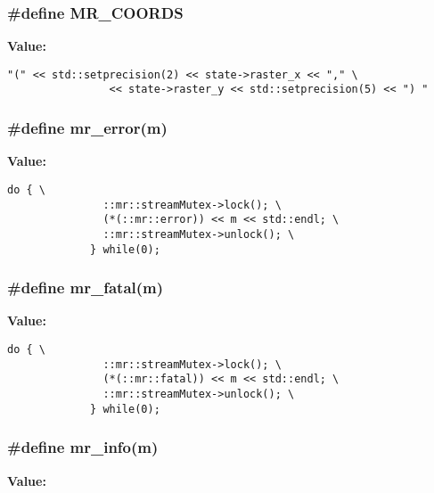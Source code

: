 \subsubsection{\setlength{\rightskip}{0pt plus 5cm}\#define MR\_\-COORDS}\label{mrStream_8h_a7}


{\bf Value:}

\footnotesize\begin{verbatim}"(" << std::setprecision(2) << state->raster_x << "," \
                << state->raster_y << std::setprecision(5) << ") "
\end{verbatim}\normalsize 
{}
\subsubsection{\setlength{\rightskip}{0pt plus 5cm}\#define mr\_\-error(m)}\label{mrStream_8h_a4}


{\bf Value:}

\footnotesize\begin{verbatim}do { \
               ::mr::streamMutex->lock(); \
               (*(::mr::error)) << m << std::endl; \
               ::mr::streamMutex->unlock(); \
             } while(0);
\end{verbatim}\normalsize 
{}
\subsubsection{\setlength{\rightskip}{0pt plus 5cm}\#define mr\_\-fatal(m)}\label{mrStream_8h_a3}


{\bf Value:}

\footnotesize\begin{verbatim}do { \
               ::mr::streamMutex->lock(); \
               (*(::mr::fatal)) << m << std::endl; \
               ::mr::streamMutex->unlock(); \
             } while(0);
\end{verbatim}\normalsize 
{}
\subsubsection{\setlength{\rightskip}{0pt plus 5cm}\#define mr\_\-info(m)}\label{mrStream_8h_a5}


{\bf Value:}

